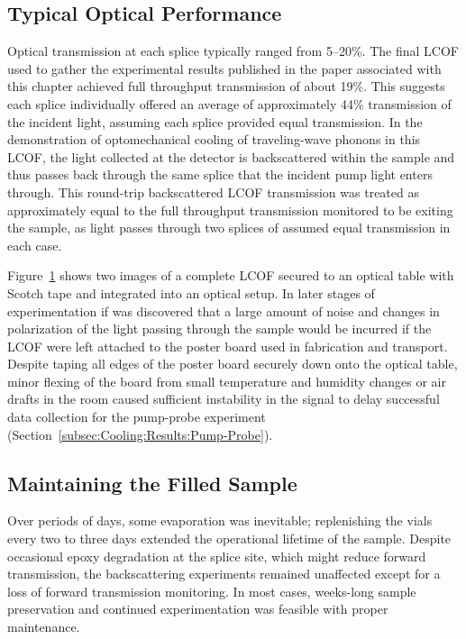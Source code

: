 \begin{figure}[t]
    \label{fig:Cooling:LCOF Taped on Table}
\end{figure}

\subsection{Typical Optical Performance}
\label{subsec:Cooling:Typical Optical Performance}

Optical transmission at each splice typically ranged from 5–20\%. The final \ac{LCOF} used to gather the experimental results published in the paper associated with this chapter achieved full throughput transmission of about 19\%. This suggests each splice individually offered an average of approximately 44\% transmission of the incident light, assuming each splice provided equal transmission. In the demonstration of optomechanical cooling of traveling-wave phonons in this \ac{LCOF}, the light collected at the detector is backscattered within the sample and thus passes back through the same splice that the incident pump light enters through. This round-trip backscattered \ac{LCOF} transmission was treated as approximately equal to the full throughput transmission monitored to be exiting the sample, as light passes through two splices of assumed equal transmission in each case.

Figure~\ref{fig:Cooling:LCOF Taped on Table} shows two images of a complete \ac{LCOF} secured to an optical table with Scotch tape and integrated into an optical setup. In later stages of experimentation if was discovered that a large amount of noise and changes in polarization of the light passing through the sample would be incurred if the \ac{LCOF} were left attached to the poster board used in fabrication and transport. Despite taping all edges of the poster board securely down onto the optical table, minor flexing of the board from small temperature and humidity changes or air drafts in the room caused sufficient instability in the signal to delay successful data collection for the pump-probe experiment (Section~\ref{subsec:Cooling:Results:Pump-Probe}).

\subsection{Maintaining the Filled Sample}

Over periods of days, some evaporation was inevitable; replenishing the vials every two to three days extended the operational lifetime of the sample. Despite occasional epoxy degradation at the splice site, which might reduce forward transmission, the backscattering experiments remained unaffected except for a loss of forward transmission monitoring. In most cases, weeks-long sample preservation and continued experimentation was feasible with proper maintenance.

